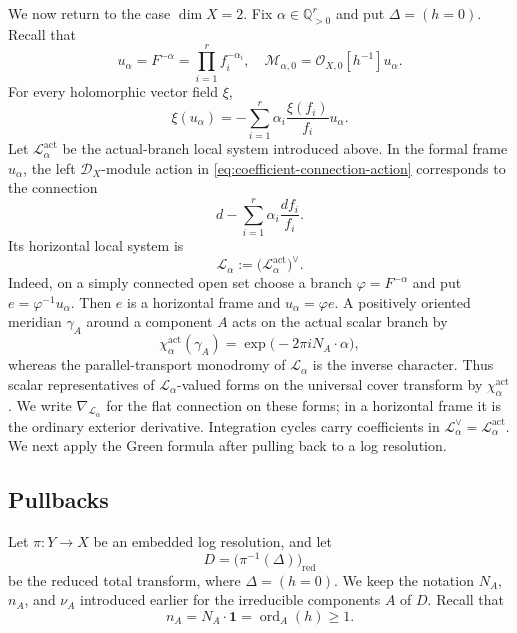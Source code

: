 \documentclass[12pt]{amsart}
\numberwithin{equation}{section}
\theoremstyle{plain}
\theoremstyle{definition}
\theoremstyle{remark}
\theoremstyle{definition}
\DeclareMathOperator{\ord}{ord}
\newcommand{\Q}{\mathbb Q}
\newcommand{\D}{\mathscr D}
\newcommand{\Lcal}{\mathscr L}
\newcommand{\one}{\mathbf 1}
\begin{document}
We now return to the case $\dim X=2$. Fix $\alpha\in\Q_{>0}^r$ and put $\Delta=(h=0)$. Recall that
\begin{equation*}
u_\alpha=F^{-\alpha}=\prod_{i=1}^r f_i^{-\alpha_i},\quad \mathcal M_{\alpha,0}=\mathcal O_{X,0}[h^{-1}]u_\alpha.
\end{equation*}
For every holomorphic vector field $\xi$,
\begin{equation}\label{eq:coefficient-connection-action}
\xi(u_\alpha)=-\sum_{i=1}^r\alpha_i\frac{\xi(f_i)}{f_i}u_\alpha.
\end{equation}
Let $\Lcal_\alpha^{\mathrm{act}}$ be the actual-branch local system introduced above. In the formal frame $u_\alpha$, the left $\D_X$-module action in \eqref{eq:coefficient-connection-action} corresponds to the connection
\[
 d-\sum_{i=1}^r\alpha_i\frac{df_i}{f_i}.
\]
Its horizontal local system is
\[
 \Lcal_\alpha:=\bigl(\Lcal_\alpha^{\mathrm{act}}\bigr)^\vee.
\]
Indeed, on a simply connected open set choose a branch $\varphi=F^{-\alpha}$ and put $e=\varphi^{-1}u_\alpha$. Then $e$ is a horizontal frame and $u_\alpha=\varphi e$. A positively oriented meridian $\gamma_A$ around a component $A$ acts on the actual scalar branch by
\begin{equation}\label{eq:actual-branch-character}
\chi_\alpha^{\mathrm{act}}(\gamma_A)=\exp\bigl(-2\pi iN_A\cdot\alpha\bigr),
\end{equation}
whereas the parallel-transport monodromy of $\Lcal_\alpha$ is the inverse character. Thus scalar representatives of $\Lcal_\alpha$-valued forms on the universal cover transform by $\chi_\alpha^{\mathrm{act}}$. We write $\nabla_{\Lcal_\alpha}$ for the flat connection on these forms; in a horizontal frame it is the ordinary exterior derivative. Integration cycles carry coefficients in $\Lcal_\alpha^\vee=\Lcal_\alpha^{\mathrm{act}}$. We next apply the Green formula after pulling back to a log resolution.



\subsection{Pullbacks}

Let $\pi:Y\to X$ be an embedded log resolution, and let
\begin{equation*}
D=\bigl(\pi^{-1}(\Delta)\bigr)_{\mathrm{red}}
\end{equation*}
be the reduced total transform, where $\Delta=(h=0)$. We keep the notation $N_A$, $n_A$, and $\nu_A$ introduced earlier for the irreducible components $A$ of $D$. Recall that
\begin{equation*}
n_A=N_A\cdot\one=\ord_A(h)\ge1. 
\end{equation*}
\end{document}
